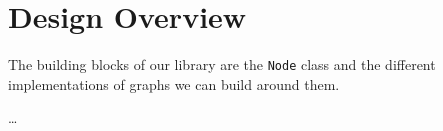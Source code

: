 \section{Design Overview}

The building blocks of our library are the \texttt{Node} class
and the different implementations of graphs we can build around them.

\ldots

